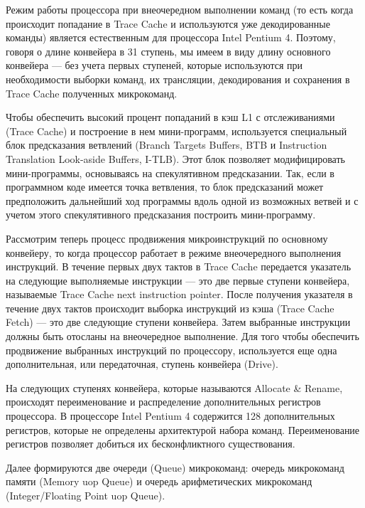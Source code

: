 \documentclass[12pt, a4paper, utf8]{article}
\begin{document}
Режим работы процессора при внеочередном выполнении команд (то есть когда происходит попадание в Trace Cache и используются уже декодированные команды) является естественным для процессора Intel Pentium 4. Поэтому, говоря о длине конвейера в 31 ступень, мы имеем в виду длину основного конвейера — без учета первых ступеней, которые используются при необходимости выборки команд, их трансляции, декодирования и сохранения в Trace Cache полученных микрокоманд.

Чтобы обеспечить высокий процент попаданий в кэш L1 с отслеживаниями (Trace Cache) и построение в нем мини-программ, используется специальный блок предсказания ветвлений (Branch Targets Buffers, BTB и Instruction Translation Look-aside Buffers, I-TLB). Этот блок позволяет модифицировать мини-программы, основываясь на спекулятивном предсказании. Так, если в программном коде имеется точка ветвления, то блок предсказаний может предположить дальнейший ход программы вдоль одной из возможных ветвей и с учетом этого спекулятивного предсказания построить мини-программу.

Рассмотрим теперь процесс продвижения микроинструкций по основному конвейеру, то когда процессор работает в режиме внеочередного выполнения инструкций. В течение первых двух тактов в Trace Cache передается указатель на следующие выполняемые инструкции — это две первые ступени конвейера, называемые Trace Cache next instruction pointer. После получения указателя в течение двух тактов происходит выборка инструкций из кэша (Trace Cache Fetch) — это две следующие ступени конвейера. Затем выбранные инструкции должны быть отосланы на внеочередное выполнение. Для того чтобы обеспечить продвижение выбранных инструкций по процессору, используется еще одна дополнительная, или передаточная, ступень конвейера (Drive).

На следующих ступенях конвейера, которые называются Allocate \& Rename, происходят переименование и распределение дополнительных регистров процессора. В процессоре Intel Pentium 4 содержится 128 дополнительных регистров, которые не определены архитектурой набора команд. Переименование регистров позволяет добиться их бесконфликтного существования.

Далее формируются две очереди (Queue) микрокоманд: очередь микрокоманд памяти (Memory uop Queue) и очередь арифметических микрокоманд (Integer/Floating Point uop Queue).
\end{document}
